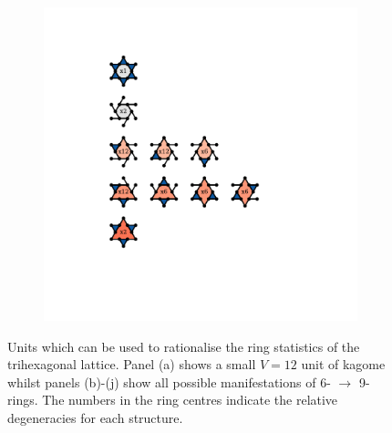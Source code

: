 \begin{figure}[bt]
\begin{subfigure}[b]{0.1\textwidth}
         \caption{}
         \label{fig:pro3pktrihex9}
     \end{subfigure}
     \hfill
     \begin{subfigure}[b]{0.1\textwidth}
         \centering
         \includegraphics[width=\textwidth]{./figures/procrystals/kagome9.pdf}
         \caption{}
         \label{fig:pro3pktrihex10}
     \end{subfigure}
     \hfill
    
     \caption{Units which can be used to rationalise the ring statistics of the trihexagonal lattice. Panel (a) shows a small $V=12$ unit of kagome whilst panels (b)\--(j) show all possible manifestations of 
6\-- $\rightarrow$ 9\-- rings.     
     The numbers in the ring centres indicate the relative degeneracies for each structure.} 
     \label{fig:pro3pktrihex}
\end{figure}

